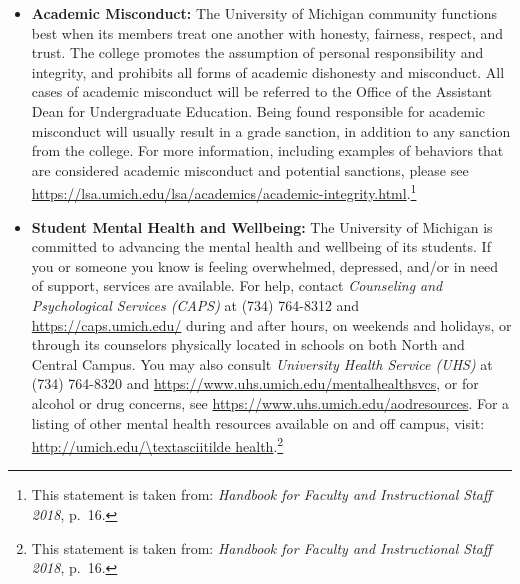 \documentclass[11pt]{article}
\begin{document}
\begin{itemize}
 \item \textbf{Academic Misconduct:}
       The University of Michigan community functions best when its members treat one another with honesty, fairness, respect, and trust.
       The college promotes the assumption of personal responsibility and integrity, and prohibits all forms of academic dishonesty and misconduct.
       All cases of academic misconduct will be referred to the Office of the Assistant Dean for Undergraduate Education.
       Being found responsible for academic misconduct will usually result in a grade sanction, in addition to any sanction from the college.
       For more information, including examples of behaviors that are considered academic misconduct and potential sanctions, please see \url{https://lsa.umich.edu/lsa/academics/academic-integrity.html}.\footnote{This statement is taken from: \textit{Handbook for Faculty and Instructional Staff 2018}, p.~16.}

 \item \textbf{Student Mental Health and Wellbeing:}
       The University of Michigan is committed to advancing the mental health and wellbeing of its students. If you or someone you know is feeling overwhelmed, depressed, and/or in need of support, services are available. For help, contact \textit{Counseling and Psychological Services (CAPS)} at (734) 764-8312 and \url{https://caps.umich.edu/} during and after hours, on weekends and holidays, or through its counselors physically located in schools on both North and Central Campus. You may also consult \textit{University Health Service (UHS)} at (734) 764-8320 and \url{https://www.uhs.umich.edu/mentalhealthsvcs}, or for alcohol or drug concerns, see \url{https://www.uhs.umich.edu/aodresources}. 
For a listing of other mental health resources available on and off campus, visit: \url{http://umich.edu/\textasciitilde health}.\footnote{This statement is taken from: \textit{Handbook for Faculty and Instructional Staff 2018}, p.~16.}
\end{itemize}
\end{document}
